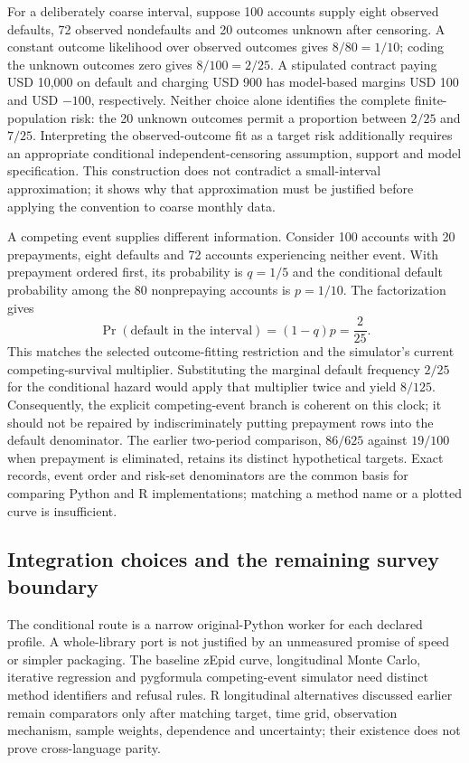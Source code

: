 For a deliberately coarse interval, suppose 100 accounts supply eight observed
defaults, 72 observed nondefaults and 20 outcomes unknown after censoring.
A constant outcome likelihood over observed outcomes gives $8/80=1/10$;
coding the unknown outcomes zero gives $8/100=2/25$. A stipulated contract
paying USD 10,000 on default and charging USD 900 has model-based margins
USD 100 and USD $-100$, respectively. Neither choice alone identifies the
complete finite-population risk: the 20 unknown outcomes permit a proportion
between $2/25$ and $7/25$. Interpreting the observed-outcome fit as a target
risk additionally requires an appropriate conditional independent-censoring
assumption, support and model specification. This construction does not
contradict a small-interval approximation; it shows why that approximation
must be justified before applying the convention to coarse monthly data.
\citep{rel25pygwitness,rel25pygfit}

A competing event supplies different information. Consider 100 accounts with
20 prepayments, eight defaults and 72 accounts experiencing neither event.
With prepayment ordered first, its probability is $q=1/5$ and the conditional
default probability among the 80 nonprepaying accounts is $p=1/10$.
The factorization gives
\[
 \Pr(\text{default in the interval})=(1-q)p=\frac{2}{25}.
\]
This matches the selected outcome-fitting restriction and the simulator's
current competing-survival multiplier. Substituting the marginal default
frequency $2/25$ for the conditional hazard would apply that multiplier twice
and yield $8/125$. Consequently, the explicit competing-event branch is
coherent on this clock; it should not be repaired by indiscriminately putting
prepayment rows into the default denominator. The earlier two-period
comparison, $86/625$ against $19/100$ when prepayment is eliminated, retains
its distinct hypothetical targets. Exact records, event order and risk-set
denominators are the common basis for comparing Python and R implementations;
matching a method name or a plotted curve is insufficient.
\citep{rel25pygwitness,rel25pygfit}


\subsection{Integration choices and the remaining survey boundary}
The conditional route is a narrow original-Python worker for each declared
profile. A whole-library port is not justified by an unmeasured promise of
speed or simpler packaging. The baseline zEpid curve, longitudinal Monte Carlo,
iterative regression and pygformula competing-event simulator need distinct
method identifiers and refusal rules. R longitudinal alternatives discussed
earlier remain comparators only after matching target, time grid, observation
mechanism, sample weights, dependence and uncertainty; their existence does
not prove cross-language parity.~\citep{exec24_longpy_zepid_source,exec24_longpy_pygformula_source}

